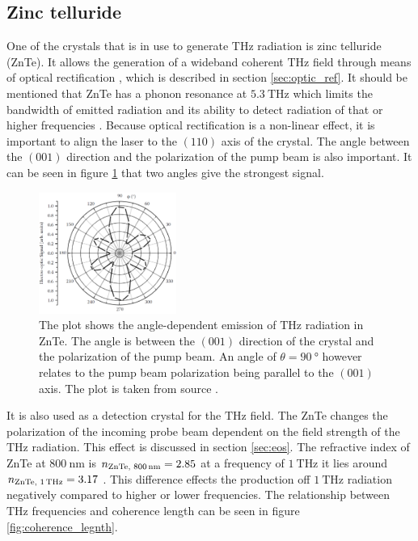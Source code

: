 \subsection{Zinc telluride}
\label{sec:znte}
One of the crystals that is in use to generate $\si{\tera\hertz}$ radiation is zinc telluride (ZnTe). 
It allows the generation of a wideband coherent $\si{\tera\hertz}$ field through means of optical rectification \cite{ZnTe_Nahata_Weling_1996}, which is described in section \ref{sec:optic_ref}.
It should be mentioned that ZnTe has a phonon resonance at $\SI{5.3}{\tera\hertz}$ which limits the bandwidth of emitted radiation and its ability to detect radiation of that or higher frequencies \cite{phonon_modes}.
Because optical rectification is a non-linear effect, it is important to align the laser to the $(110)$ axis of the crystal.
The angle between the $(001)$ direction and the polarization of the pump beam is also important.
It can be seen in figure \ref{fig:polarization_dependence_angle} that two angles give the strongest signal.
\begin{figure}
    \centering
    \includegraphics[width=0.4\textwidth]{refferenced_pic/degreedepenceZnTe.png}
    \caption{The plot shows the angle-dependent emission of $\si{\tera\hertz}$ radiation in ZnTe.
    The angle is between the $(001)$ direction of the crystal and the polarization of the pump beam. An angle of $\theta = \SI{90}{\degree}$ however relates to the pump beam polarization being parallel to the $(001)$ axis.
    The plot is taken from source \cite{selig}.}
    \label{fig:polarization_dependence_angle}
\end{figure}
It is also used as a detection crystal for the $\si{\tera\hertz}$ field.
The ZnTe changes the polarization of the incoming probe beam dependent on the field strength of the $\si{\tera\hertz}$ radiation.
This effect is discussed in section \ref{sec:eos}.
The refractive index of ZnTe at $\SI{800}{\nano\meter}$ is $n_\text{ZnTe, 800\,nm} = 2.85$ \cite{refractive_index_znte} at a frequency of $\SI{1}{\tera\hertz}$ it lies around  $n_\text{ZnTe, 1\,THz} = 3.17$ \cite{hebling2004tunable}.
This difference effects the production off $\SI{1}{\tera\hertz}$ radiation negatively compared to higher or lower frequencies.
The relationship between $\si{\tera\hertz}$ frequencies and coherence length can be seen in figure \ref{fig:coherence_legnth}.
